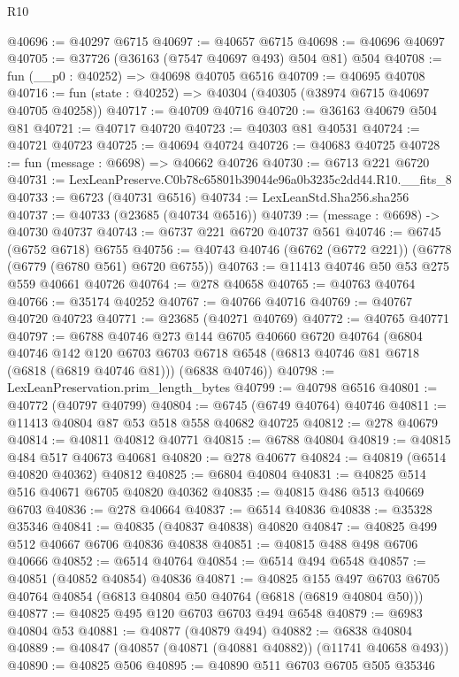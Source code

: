 \begin{lexlean}{R10}
\begin{coremodule}
@40696 := @40297 @6715
@40697 := @40657 @6715
@40698 := @40696 @40697
@40705 := @37726 (@36163 (@7547 @40697 @493) @504 @81) @504
@40708 := fun (__p0 : @40252) => @40698 @40705 @6516
@40709 := @40695 @40708
@40716 := fun (state : @40252) => @40304 (@40305 (@38974 @6715 @40697 @40705 @40258))
@40717 := @40709 @40716
@40720 := @36163 @40679 @504 @81
@40721 := @40717 @40720
@40723 := @40303 @81 @40531
@40724 := @40721 @40723
@40725 := @40694 @40724
@40726 := @40683 @40725
@40728 := fun (message : @6698) => @40662 @40726
@40730 := @6713 @221 @6720
@40731 := LexLeanPreserve.C0b78c65801b39044e96a0b3235c2dd44.R10.__fits_8
@40733 := @6723 (@40731 @6516)
@40734 := LexLeanStd.Sha256.sha256
@40737 := @40733 (@23685 (@40734 @6516))
@40739 := (message : @6698) -> @40730 @40737
@40743 := @6737 @221 @6720 @40737 @561
@40746 := @6745 (@6752 @6718) @6755
@40756 := @40743 @40746 (@6762 (@6772 @221)) (@6778 (@6779 (@6780 @561) @6720 @6755))
@40763 := @11413 @40746 @50 @53 @275 @559 @40661 @40726
@40764 := @278 @40658
@40765 := @40763 @40764
@40766 := @35174 @40252
@40767 := @40766 @40716
@40769 := @40767 @40720 @40723
@40771 := @23685 (@40271 @40769)
@40772 := @40765 @40771
@40797 := @6788
    @40746
    @273
    @144
    @6705
    @40660
    @6720
    @40764
    (@6804
      @40746
      @142
      @120
      @6703
      @6703
      @6718
      @6548
      (@6813 @40746 @81 @6718 (@6818 (@6819 @40746 @81)))
      (@6838 @40746))
@40798 := LexLeanPreservation.prim_length_bytes
@40799 := @40798 @6516
@40801 := @40772 (@40797 @40799)
@40804 := @6745 (@6749 @40764) @40746
@40811 := @11413 @40804 @87 @53 @518 @558 @40682 @40725
@40812 := @278 @40679
@40814 := @40811 @40812 @40771
@40815 := @6788 @40804
@40819 := @40815 @484 @517 @40673 @40681
@40820 := @278 @40677
@40824 := @40819 (@6514 @40820 @40362) @40812
@40825 := @6804 @40804
@40831 := @40825 @514 @516 @40671 @6705 @40820 @40362
@40835 := @40815 @486 @513 @40669 @6703
@40836 := @278 @40664
@40837 := @6514 @40836
@40838 := @35328 @35346
@40841 := @40835 (@40837 @40838) @40820
@40847 := @40825 @499 @512 @40667 @6706 @40836 @40838
@40851 := @40815 @488 @498 @6706 @40666
@40852 := @6514 @40764
@40854 := @6514 @494 @6548
@40857 := @40851 (@40852 @40854) @40836
@40871 := @40825
    @155
    @497
    @6703
    @6705
    @40764
    @40854
    (@6813 @40804 @50 @40764 (@6818 (@6819 @40804 @50)))
@40877 := @40825 @495 @120 @6703 @6703 @494 @6548
@40879 := @6983 @40804 @53
@40881 := @40877 (@40879 @494)
@40882 := @6838 @40804
@40889 := @40847 (@40857 (@40871 (@40881 @40882)) (@11741 @40658 @493))
@40890 := @40825 @506
@40895 := @40890 @511 @6703 @6705 @505 @35346

\end{coremodule}
\end{lexlean}
